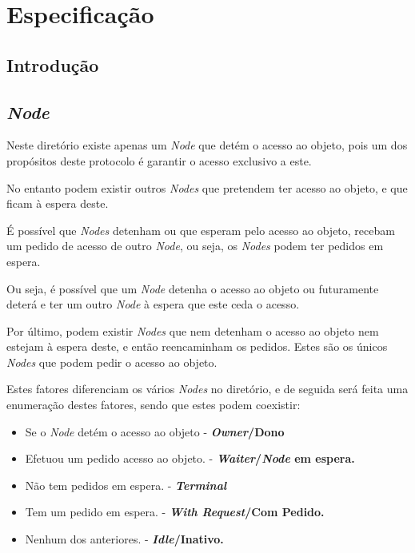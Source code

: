 \chapter{Especificação}
\label{chap:especificacao}

\section{Introdução}
\label{especificacao:sec:intro}
\section{\emph{Node}}

\begin{comment}
\end{comment}


Neste diretório existe apenas um \emph{Node} que detém o acesso ao objeto, pois um dos propósitos deste protocolo é garantir o acesso exclusivo a este. 


No entanto podem existir outros \emph{Nodes} que pretendem ter acesso ao objeto, e que ficam à espera deste. 

É possível que \emph{Nodes} detenham ou que esperam pelo acesso ao objeto, recebam um pedido de acesso de outro \emph{Node}, ou seja, os \emph{Nodes} podem ter pedidos em espera.

Ou seja, é possível que um \emph{Node} detenha o acesso ao objeto ou futuramente deterá e ter um outro \emph{Node} à espera que este ceda o acesso.

Por último, podem existir \emph{Nodes} que nem detenham o acesso ao objeto nem estejam à espera deste, e então reencaminham os pedidos. Estes são os únicos \emph{Nodes} que podem pedir o acesso ao objeto.

Estes fatores diferenciam os vários \emph{Nodes} no diretório,
e de seguida será feita uma enumeração destes fatores, sendo que estes podem coexistir:

\begin{itemize}
    \item Se o \emph{Node} detém o acesso ao objeto - \textbf{\emph{Owner}/Dono}
    \item Efetuou um pedido acesso ao objeto. - \textbf{\emph{Waiter}/\emph{Node} em espera. }

    \item Não tem pedidos em espera. - \textbf{\emph{Terminal}}
    \item Tem um pedido em espera. - \textbf{\emph{With Request}/Com Pedido.}

    \item Nenhum dos anteriores. - \textbf{\emph{Idle}/Inativo.}
\end{itemize}


